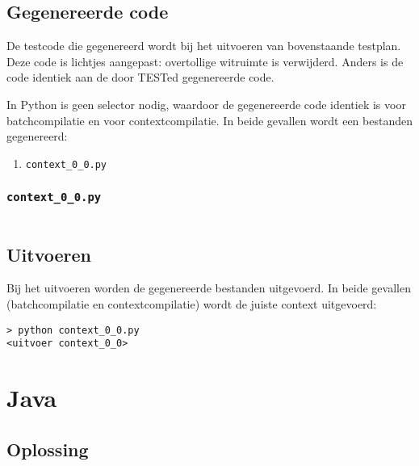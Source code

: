 \inputminted{python}{sources/echo-function/correct.py}

\subsection{Gegenereerde code}\label{subsec:echo-function-python-gegenereerde-code}

De testcode die gegenereerd wordt bij het uitvoeren van bovenstaande testplan.
Deze code is lichtjes aangepast: overtollige witruimte is verwijderd.
Anders is de code identiek aan de door TESTed gegenereerde code.

In Python is geen selector nodig, waardoor de gegenereerde code identiek is voor batchcompilatie en voor contextcompilatie.
In beide gevallen wordt een bestanden gegenereerd:

\begin{enumerate}
    \item \texttt{context\_0\_0.py}
\end{enumerate}

\subsubsection{\texttt{context\_0\_0.py}}

\inputminted{python}{sources/echo-function/context_0_0.py}

\subsection{Uitvoeren}\label{subsec:echo-function-python-uitvoeren}

Bij het uitvoeren worden de gegenereerde bestanden uitgevoerd.
In beide gevallen (batchcompilatie en contextcompilatie) wordt de juiste context uitgevoerd:

\begin{verbatim}
> python context_0_0.py
<uitvoer context_0_0>
\end{verbatim}

\section{Java}\label{sec:echo-function-java}

\subsection{Oplossing}\label{subsec:echo-function-java-oplossing}

